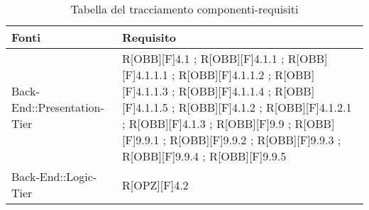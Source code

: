 \begin{table}[h]
		\centering
		\caption{Tabella del tracciamento componenti-requisiti}
		\begin{tabular}{|p{}|p{}|}
			\toprule
			
			\textbf{Fonti} & \textbf{Requisito} \\
			
			\midrule

			Back-End::Presentation-Tier & R[OBB][F]4.1 ; R[OBB][F]4.1.1 ; R[OBB][F]4.1.1.1 ; R[OBB][F]4.1.1.2 ; R[OBB][F]4.1.1.3 ; R[OBB][F]4.1.1.4 ; R[OBB][F]4.1.1.5 ; R[OBB][F]4.1.2 ; R[OBB][F]4.1.2.1 ; R[OBB][F]4.1.3 ; R[OBB][F]9.9 ; R[OBB][F]9.9.1 ; R[OBB][F]9.9.2 ; R[OBB][F]9.9.3 ; R[OBB][F]9.9.4 ; R[OBB][F]9.9.5\\ \midrule

			Back-End::Logic-Tier & R[OPZ][F]4.2 \\ \midrule
			

\end{tabular}
\end{table}
